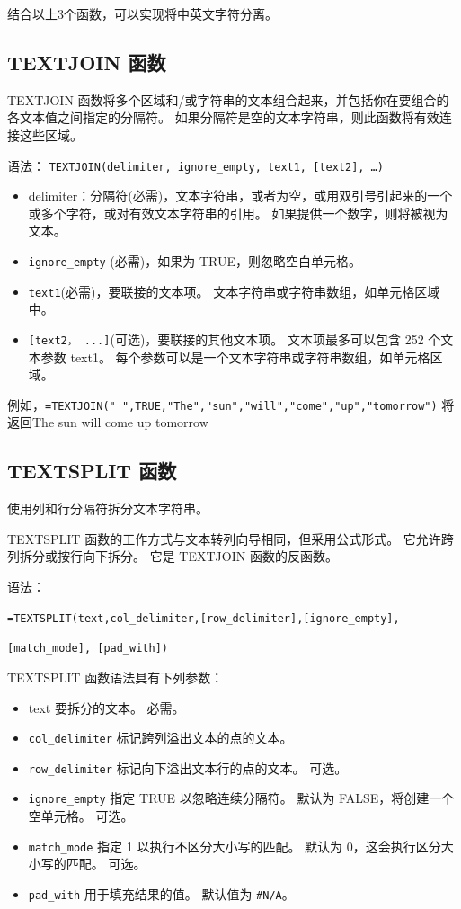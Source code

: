 结合以上3个函数，可以实现将中英文字符分离。

\subsection{TEXTJOIN 函数}

TEXTJOIN 函数将多个区域和/或字符串的文本组合起来，并包括你在要组合的各文本值之间指定的分隔符。 如果分隔符是空的文本字符串，则此函数将有效连接这些区域。

语法：
\verb|TEXTJOIN(delimiter, ignore_empty, text1, [text2], …)|

\begin{itemize}
  \item delimiter：分隔符(必需)，文本字符串，或者为空，或用双引号引起来的一个或多个字符，或对有效文本字符串的引用。 如果提供一个数字，则将被视为文本。
  \item \verb|ignore_empty| (必需)，如果为 TRUE，则忽略空白单元格。
  \item \verb|text1|(必需)，要联接的文本项。 文本字符串或字符串数组，如单元格区域中。
  \item \verb|[text2， ...]|(可选)，要联接的其他文本项。 文本项最多可以包含 252 个文本参数 text1。 每个参数可以是一个文本字符串或字符串数组，如单元格区域。
\end{itemize}

例如，\verb|=TEXTJOIN(" ",TRUE,"The","sun","will","come","up","tomorrow")| 将返回The sun will come up tomorrow

\subsection{TEXTSPLIT 函数}

使用列和行分隔符拆分文本字符串。

TEXTSPLIT 函数的工作方式与文本转列向导相同，但采用公式形式。 它允许跨列拆分或按行向下拆分。 它是 TEXTJOIN 函数的反函数。 

语法：

\verb|=TEXTSPLIT(text,col_delimiter,[row_delimiter],[ignore_empty], |

\verb|[match_mode], [pad_with])|

TEXTSPLIT 函数语法具有下列参数：
\begin{itemize}
  \item text       要拆分的文本。 必需。
  \item \verb|col_delimiter|       标记跨列溢出文本的点的文本。
  \item \verb|row_delimiter|       标记向下溢出文本行的点的文本。 可选。
  \item \verb|ignore_empty|       指定 TRUE 以忽略连续分隔符。 默认为 FALSE，将创建一个空单元格。 可选。
  \item \verb|match_mode|    指定 1 以执行不区分大小写的匹配。 默认为 0，这会执行区分大小写的匹配。 可选。
  \item \verb|pad_with|           用于填充结果的值。 默认值为 \verb|#N/A|。
\end{itemize}